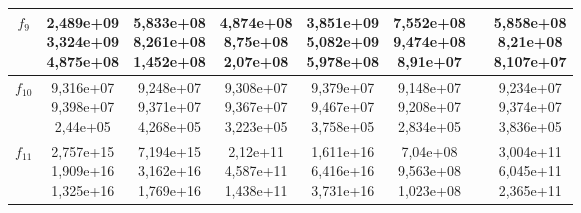 \begin{table}[t]
\begin{small}
\begin{tabular}{|c|c|c|c|c|c|c|c|}
        $f_9$    & \makecell{2,489e+09 \\ 3,324e+09 \\ 4,875e+08} & \makecell{5,833e+08 \\ 8,261e+08 \\ 1,452e+08} & \makecell{4,874e+08 \\ 8,75e+08 \\ 2,07e+08}   & \makecell{3,851e+09 \\ 5,082e+09 \\ 5,978e+08} & \makecell{7,552e+08 \\ 9,474e+08 \\ 8,91e+07}  & & \makecell{5,858e+08 \\ 8,21e+08 \\ 8,107e+07} \\\hline
        $f_{10}$ & \makecell{9,316e+07 \\ 9,398e+07 \\ 2,44e+05}  & \makecell{9,248e+07 \\ 9,371e+07 \\ 4,268e+05} & \makecell{9,308e+07 \\ 9,367e+07 \\ 3,223e+05} & \makecell{9,379e+07 \\ 9,467e+07 \\ 3,758e+05} & \makecell{9,148e+07 \\ 9,208e+07 \\ 2,834e+05} & & \makecell{9,234e+07 \\ 9,374e+07 \\ 3,836e+05} \\\hline
        $f_{11}$ & \makecell{2,757e+15 \\ 1,909e+16 \\ 1,325e+16} & \makecell{7,194e+15 \\ 3,162e+16 \\ 1,769e+16} & \makecell{2,12e+11 \\ 4,587e+11 \\ 1,438e+11}  & \makecell{1,611e+16 \\ 6,416e+16 \\ 3,731e+16} & \makecell{7,04e+08 \\ 9,563e+08 \\ 1,023e+08}  & & \makecell{3,004e+11 \\ 6,045e+11 \\ 2,365e+11} \\\hline

\end{tabular}
\end{small}
\end{table}
